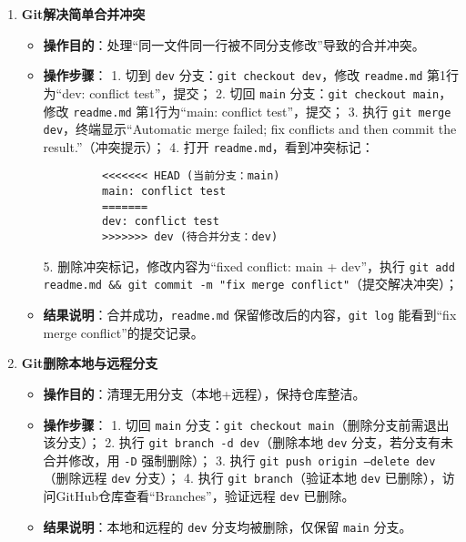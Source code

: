 \documentclass[a4paper]{article}
\begin{document}
\begin{enumerate}[itemsep=2\parskip, label=实例1.\arabic*]
\item \textbf{Git解决简单合并冲突}
  \begin{itemize}[leftmargin=2em, itemsep=0.5\parskip]
    \item \textbf{操作目的}：处理“同一文件同一行被不同分支修改”导致的合并冲突。
    \item \textbf{操作步骤}：
      1. 切到 \texttt{dev} 分支：\texttt{git checkout dev}，修改 \texttt{readme.md} 第1行为“dev: conflict test”，提交；
      2. 切回 \texttt{main} 分支：\texttt{git checkout main}，修改 \texttt{readme.md} 第1行为“main: conflict test”，提交；
      3. 执行 \texttt{git merge dev}，终端显示“Automatic merge failed; fix conflicts and then commit the result.”（冲突提示）；
      4. 打开 \texttt{readme.md}，看到冲突标记：
         \begin{verbatim}
         <<<<<<< HEAD (当前分支：main)
         main: conflict test
         =======
         dev: conflict test
         >>>>>>> dev (待合并分支：dev)
         \end{verbatim}
      5. 删除冲突标记，修改内容为“fixed conflict: main + dev”，执行 \texttt{git add readme.md \&\& git commit -m "fix merge conflict"}（提交解决冲突）；  %
    \item \textbf{结果说明}：合并成功，\texttt{readme.md} 保留修改后的内容，\texttt{git log} 能看到“fix merge conflict”的提交记录。
  \end{itemize}

\item \textbf{Git删除本地与远程分支}
  \begin{itemize}[leftmargin=2em, itemsep=0.5\parskip]
    \item \textbf{操作目的}：清理无用分支（本地+远程），保持仓库整洁。
    \item \textbf{操作步骤}：
      1. 切回 \texttt{main} 分支：\texttt{git checkout main}（删除分支前需退出该分支）；
      2. 执行 \texttt{git branch -d dev}（删除本地 \texttt{dev} 分支，若分支有未合并修改，用 \texttt{-D} 强制删除）；
      3. 执行 \texttt{git push origin --delete dev}（删除远程 \texttt{dev} 分支）；
      4. 执行 \texttt{git branch}（验证本地 \texttt{dev} 已删除），访问GitHub仓库查看“Branches”，验证远程 \texttt{dev} 已删除。
    \item \textbf{结果说明}：本地和远程的 \texttt{dev} 分支均被删除，仅保留 \texttt{main} 分支。
  \end{itemize}


\end{enumerate}
\end{document}
